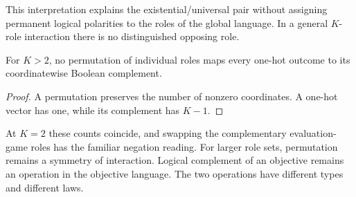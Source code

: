 This interpretation explains the existential/universal pair without assigning
permanent logical polarities to the roles of the global language. In a
general $K$-role interaction there is no distinguished opposing role.

\begin{proposition}
For $K>2$, no permutation of individual roles maps every one-hot outcome to
its coordinatewise Boolean complement.
\end{proposition}
\begin{proof}
A permutation preserves the number of nonzero coordinates. A one-hot vector
has one, while its complement has $K-1$.
\end{proof}

At $K=2$ these counts coincide, and swapping the complementary evaluation-game
roles has the familiar negation reading. For larger role sets, permutation
remains a symmetry of interaction. Logical complement of an objective remains
an operation in the objective language. The two operations have different
types and different laws.
